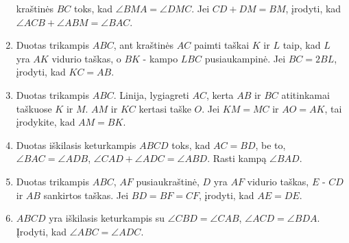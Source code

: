 \begin{enumerate}
  kraštinės $BC$ toks, kad $\angle BMA = \angle DMC$. Jei $CD + DM = BM$,
  įrodyti, kad $\angle ACB +\angle ABM=\angle BAC$.
\item Duotas trikampis $ABC$, ant kraštinės $AC$ paimti taškai $K$ ir $L$
  taip, kad $L$ yra $AK$ vidurio taškas, o $BK$ - kampo $LBC$
  pusiaukampinė. Jei $BC = 2BL$, įrodyti, kad $KC = AB$. 
\item Duotas trikampis $ABC$. Linija, lygiagreti $AC$, kerta $AB$ ir $BC$
  atitinkamai taškuose $K$ ir $M$. $AM$ ir $KC$ kertasi taške $O$. Jei $KM
  = MC$ ir $AO = AK$, tai įrodykite, kad $AM = BK$. 
\item Duotas iškilasis keturkampis $ABCD$ toks, kad $AC = BD$, be to,
  $\angle BAC = \angle ADB$, $\angle CAD + \angle ADC = \angle ABD$. Rasti
  kampą $\angle BAD$.
\item Duotas trikampis $ABC$, $AF$ pusiaukraštinė, $D$ yra $AF$ vidurio
  taškas, $E$ - $CD$ ir $AB$ sankirtos taškas.  Jei $BD = BF = CF$,
  įrodyti, kad $AE = DE$.
\item $ABCD$ yra iškilasis keturkampis su $\angle CBD = \angle CAB$,
  $\angle ACD = \angle BDA$. Įrodyti, kad $\angle ABC = \angle ADC$.

\end{enumerate}
